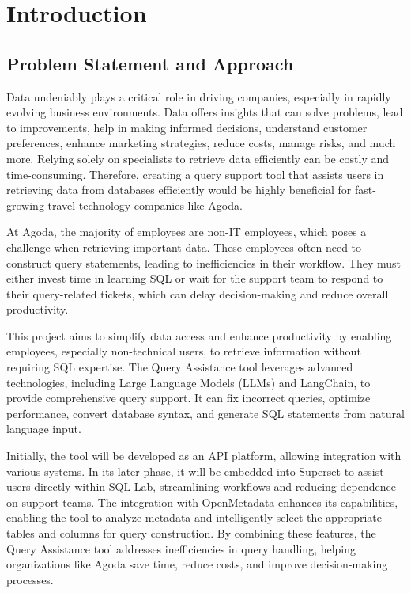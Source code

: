 \chapter{Introduction}



\section{Problem Statement and Approach}

Data undeniably plays a critical role in driving companies, especially in rapidly evolving business environments. Data offers insights that can solve problems, lead to improvements, help in making informed decisions, understand customer preferences, enhance marketing strategies, reduce costs, manage risks, and much more. Relying solely on specialists to retrieve data efficiently can be costly and time-consuming. Therefore, creating a query support tool that assists users in retrieving data from databases efficiently would be highly beneficial for fast-growing travel technology companies like Agoda.

At Agoda, the majority of employees are non-IT employees, which poses a challenge when retrieving important data. These employees often need to construct query statements, leading to inefficiencies in their workflow. They must either invest time in learning SQL or wait for the support team to respond to their query-related tickets, which can delay decision-making and reduce overall productivity.

This project aims to simplify data access and enhance productivity by enabling employees, especially non-technical users, to retrieve information without requiring SQL expertise. The Query Assistance tool leverages advanced technologies, including Large Language Models (LLMs) and LangChain, to provide comprehensive query support. It can fix incorrect queries, optimize performance, convert database syntax, and generate SQL statements from natural language input.

Initially, the tool will be developed as an API platform, allowing integration with various systems. In its later phase, it will be embedded into Superset to assist users directly within SQL Lab, streamlining workflows and reducing dependence on support teams. The integration with OpenMetadata enhances its capabilities, enabling the tool to analyze metadata and intelligently select the appropriate tables and columns for query construction. By combining these features, the Query Assistance tool addresses inefficiencies in query handling, helping organizations like Agoda save time, reduce costs, and improve decision-making processes.

